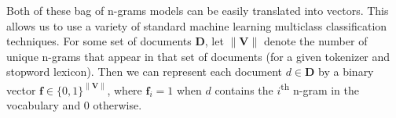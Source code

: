 Both of these bag of n-grams models can be easily translated into vectors. This allows us to use a variety of standard machine learning multiclass classification techniques. For some set of documents $\mathbf{D}$, let $\| \mathbf{V} \|$ denote the number of unique n-grams that appear in that set of documents (for a given tokenizer and stopword lexicon). Then we can represent each document $ d \in \mathbf{D}$ by a binary vector $\mathbf{f} \in \{0,1\}^{\| \mathbf{V} \|}$, where $\mathbf{f}_i = 1$ when $d$ contains the $i$\textsuperscript{th} n-gram in the vocabulary and 0 otherwise.


